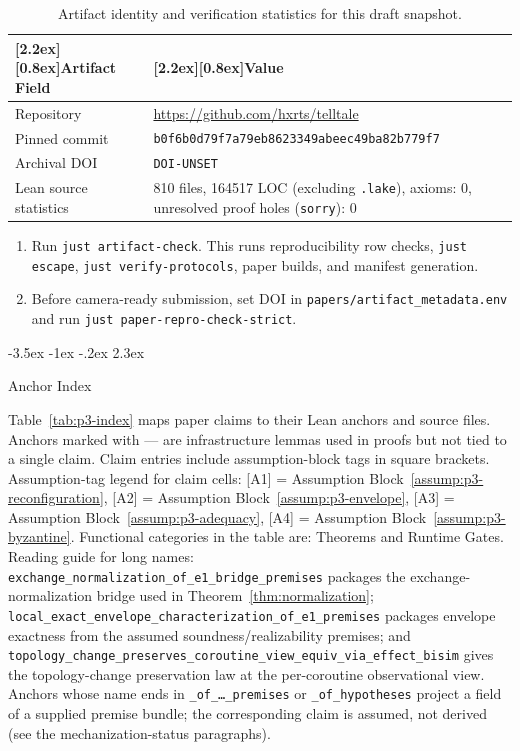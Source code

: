 \documentclass[a4paper,10pt,twocolumn,english]{article}
\makeatletter
\renewcommand{\section}{\@startsection{section}{1}{\z@}%
  {-3.5ex \@plus -1ex \@minus -.2ex}%
  {2.3ex}%
  {\raggedright\normalfont\large\bfseries}}
\numberwithin{equation}{section}
\theoremstyle{paperdef}
\theoremstyle{paperplain}
\theoremstyle{paperdef}
\theoremstyle{paperremark}
\theoremstyle{paperdef}
\newcommand{\thead}[1]{\textbf{\raisebox{0pt}[2.2ex][0.8ex]{#1}}}
\makeatother
\begin{document}
\begin{table}[H]
	\centering
	\footnotesize
	\begin{tabularx}{\columnwidth}{@{}L{0.34\columnwidth}L{0.61\columnwidth}@{}}
		\toprule
		\thead{Artifact Field} & \thead{Value}                                                                             \\
		\midrule
		Repository             & \url{https://github.com/hxrts/telltale}                                                   \\
		Pinned commit & \texttt{b0f6b0d79f7a79eb}\allowbreak\texttt{8623349abeec49ba}\allowbreak\texttt{82b779f7} \\
		Archival DOI & \texttt{DOI-UNSET} \\
		Lean source statistics & 810 files, 164517 LOC (excluding \texttt{.lake}), axioms: 0, unresolved proof holes (\texttt{sorry}): 0 \\
		\bottomrule
	\end{tabularx}
	\caption{Artifact identity and verification statistics for this draft snapshot.}
\end{table}

\begin{enumerate}
	\item Run \texttt{just artifact-check}. This runs reproducibility row checks, \texttt{just escape}, \texttt{just verify-protocols}, paper builds, and manifest generation.
	\item Before camera-ready submission, set DOI in \texttt{papers/artifact\_metadata.env} and run \texttt{just paper-repro-check-strict}.
\end{enumerate}

\clearpage
\onecolumn

\section{Anchor Index}
\label{app:index}

Table~\ref{tab:p3-index} maps paper claims to their Lean anchors and source files. Anchors marked with --- are infrastructure lemmas used in proofs but not tied to a single claim. Claim entries include assumption-block tags in square brackets.
Assumption-tag legend for claim cells: [A1] = Assumption
Block~\ref{assump:p3-reconfiguration}, [A2] = Assumption
Block~\ref{assump:p3-envelope}, [A3] = Assumption
Block~\ref{assump:p3-adequacy}, [A4] = Assumption
Block~\ref{assump:p3-byzantine}.
Functional categories in the table are: Theorems and Runtime Gates. Reading
guide for long names:
\texttt{exchange\_normalization\_of\_e1\_bridge\_premises} packages the
exchange-normalization bridge used in Theorem~\ref{thm:normalization};
\texttt{local\_exact\_envelope\_characterization\_of\_e1\_premises} packages
envelope exactness from the assumed soundness/realizability premises; and
\texttt{topology\_change\_preserves\_coroutine\_view\_equiv\_via\_effect\_bisim} gives the
topology-change preservation law at the per-coroutine observational view.
Anchors whose name ends in \texttt{\_of\_\ldots\_premises} or
\texttt{\_of\_hypotheses} project a field of a supplied premise bundle; the
corresponding claim is assumed, not derived (see the mechanization-status
paragraphs).
\end{document}
